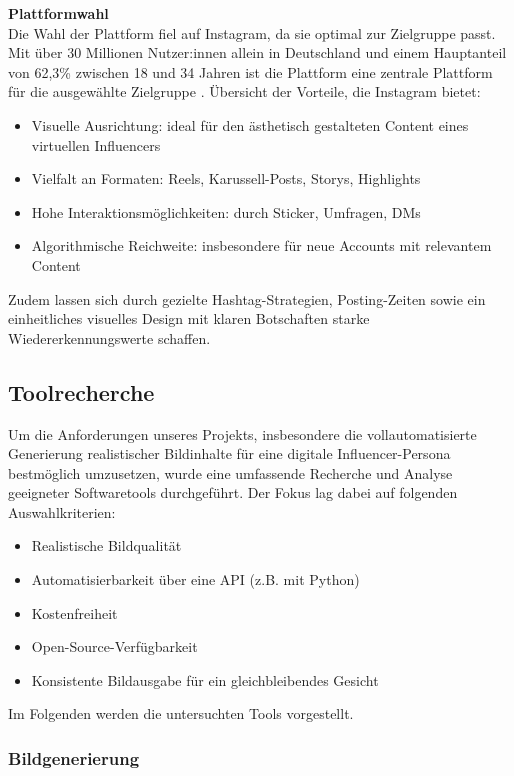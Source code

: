 \documentclass[a4paper,12pt]{article}
\begin{document}
\textbf{Plattformwahl} \\
Die Wahl der Plattform fiel auf Instagram, da sie optimal zur Zielgruppe passt. Mit über 30 Millionen Nutzer:innen allein in Deutschland und einem Hauptanteil von 62,3\% zwischen 18 und 34 Jahren ist die Plattform eine zentrale Plattform für die ausgewählte Zielgruppe .
Übersicht der Vorteile, die Instagram bietet:
\begin{itemize}
    \item Visuelle Ausrichtung: ideal für den ästhetisch gestalteten Content eines virtuellen Influencers
    \item Vielfalt an Formaten: Reels, Karussell-Posts, Storys, Highlights
    \item Hohe Interaktionsmöglichkeiten: durch Sticker, Umfragen, DMs
    \item Algorithmische Reichweite: insbesondere für neue Accounts mit relevantem Content
\end{itemize}
Zudem lassen sich durch gezielte Hashtag-Strategien, Posting-Zeiten sowie ein einheitliches visuelles Design mit klaren Botschaften starke Wiedererkennungswerte schaffen.


\subsection{Toolrecherche}

Um die Anforderungen unseres Projekts, insbesondere die vollautomatisierte Generierung realistischer Bildinhalte für eine digitale Influencer-Persona bestmöglich umzusetzen, wurde eine umfassende Recherche und Analyse geeigneter Softwaretools durchgeführt. Der Fokus lag dabei auf folgenden Auswahlkriterien:
\begin{itemize}
    \item Realistische Bildqualität
    \item Automatisierbarkeit über eine API (z.B. mit Python)
    \item Kostenfreiheit
    \item Open-Source-Verfügbarkeit
    \item Konsistente Bildausgabe für ein gleichbleibendes Gesicht
\end{itemize}

Im Folgenden werden die untersuchten Tools vorgestellt. \\

\subsubsection{Bildgenerierung} \\
\end{document}
